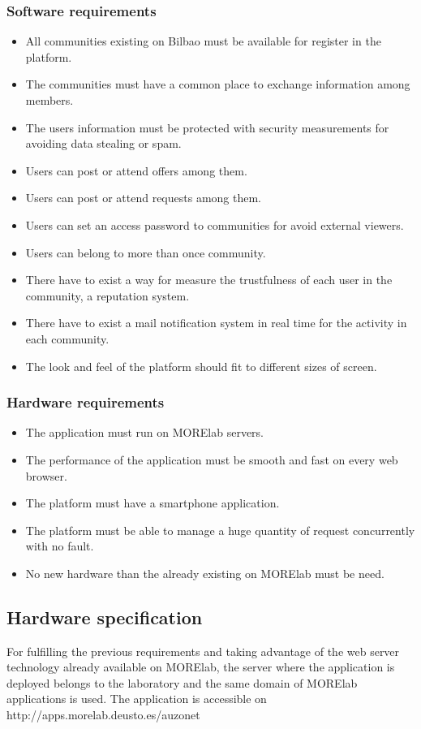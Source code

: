 \documentclass{DeustoFDP}
\begin{document}
\subsubsection{Software requirements}
\begin{itemize}
	\item All communities existing on Bilbao must be available for register in the platform.
	\item The communities must have a common place to exchange information among members.
	\item The users information must be protected with security measurements for avoiding data stealing or spam.
	\item Users can post or attend offers among them.
	\item Users can post or attend requests among them.
	\item Users can set an access password to communities for avoid external viewers.
	\item Users can belong to more than once community.
	\item There have to exist a way for measure the trustfulness of each user in the community, a reputation system.
	\item There have to exist a mail notification system in real time for the activity in each community.
	\item The look and feel of the platform should fit to different sizes of screen.
\end{itemize}

\subsubsection{Hardware requirements}
\begin{itemize}
	\item The application must run on MORElab servers.
	\item The performance of the application must be smooth and fast on every web browser.
	\item The platform must have a smartphone application.
	\item The platform must be able to manage a huge quantity of request concurrently with no fault.
	\item No new hardware than the already existing on MORElab must be need.
\end{itemize}
\subsection{Hardware specification}
For fulfilling the previous requirements and taking advantage of the web server technology already available on MORElab, the server where the application is deployed belongs to the laboratory and the same domain of MORElab applications is used. The application is accessible on http://apps.morelab.deusto.es/auzonet
\end{document}
